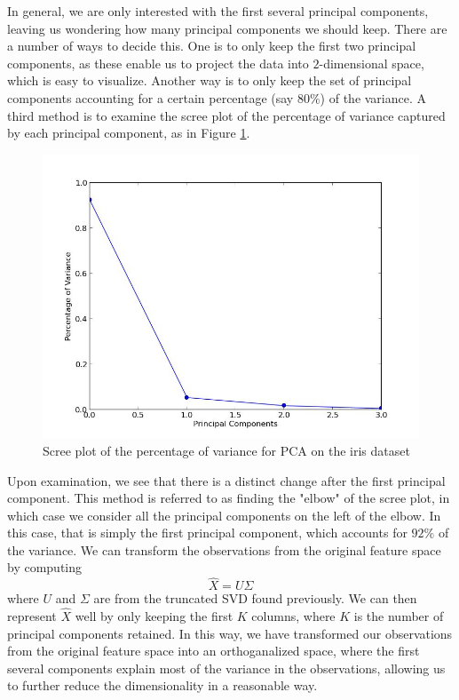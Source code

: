 In general, we are only interested with the first several principal components, leaving us wondering how many principal components we should keep. There are a number of ways to decide this. One is to only keep the first two principal components, as these enable us to project the data into $2$-dimensional space, which is easy to visualize. Another way is to only keep the set of principal components accounting for a certain percentage (say $80\%$) of the variance. A third method is to examine the scree plot of the percentage of variance captured by each principal component, as in Figure \ref{fig:scree}.
\begin{figure}
\centering
\includegraphics[width=\textwidth]{scree.jpg}
\caption{Scree plot of the percentage of variance for PCA on the iris dataset}
\label{fig:scree}
\end{figure}
Upon examination, we see that there is a distinct change after the first principal component. This method is referred to as finding the "elbow" of the scree plot, in which case we consider all the principal components on the left of the elbow. In this case, that is simply the first principal component, which accounts for $92\%$ of the variance.
We can transform the observations from the original feature space by computing 
\begin{equation*}
\widehat{X} = U\Sigma
\end{equation*}
where $U$ and $\Sigma$ are from the truncated SVD found previously. We can then represent $\widehat{X}$ well by only keeping the first $K$ columns, where $K$ is the number of principal components retained. In this way, we have transformed our observations from the original feature space into an orthoganalized space, where the first several components explain most of the variance in the observations, allowing us to further reduce the dimensionality in a reasonable way.

